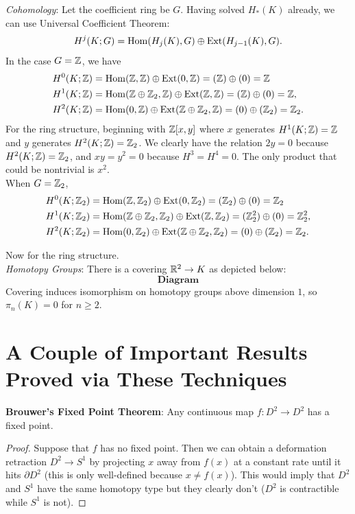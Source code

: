\documentclass{amsart}
\begin{document}
	\textit{Cohomology}: Let the coefficient ring be $G$. Having solved $H_*(K)$ already, we can use Universal Coefficient Theorem:
	$$
	H^j(K;G) = \operatorname{Hom}(H_j(K),G) \oplus \operatorname{Ext}(H_{j-1}(K),G).
	$$
	In the case $G=\mathbb{Z}$, we have 
	\begin{align*}	
	H^0(K;\mathbb{Z}) &= \operatorname{Hom}(\mathbb{Z},\mathbb{Z})\oplus \operatorname{Ext}(0,\mathbb{Z}) =(\mathbb{Z})\oplus (0)= \mathbb{Z}\\
	H^1(K;\mathbb{Z}) &= \operatorname{Hom}(\mathbb{Z}\oplus \mathbb{Z}_2,\mathbb{Z})\oplus \operatorname{Ext}(\mathbb{Z},\mathbb{Z}) = (\mathbb{Z})\oplus(0)= \mathbb{Z},\\ 
	H^2(K;\mathbb{Z}) &= \operatorname{Hom}(0,\mathbb{Z}) \oplus \operatorname{Ext}(\mathbb{Z}\oplus \mathbb{Z}_2,\mathbb{Z}) = (0)\oplus(\mathbb{Z}_2) = \mathbb{Z}_2.
	\end{align*}
	For the ring structure, beginning with $\mathbb{Z}[x,y]$ where $x$ generates $H^1(K;\mathbb{Z})=\mathbb{Z}$ and $y$ generates $H^2(K;\mathbb{Z})=\mathbb{Z}_2$. We clearly have the relation $2y=0$ because $H^2(K;\mathbb{Z})=\mathbb{Z}_2$, and $xy=y^2=0$ because $H^3=H^4=0$. The only product that could be nontrivial is $x^2$.\\
	
	When $G=\mathbb{Z}_2$,
	\begin{align*}	
	H^0(K;\mathbb{Z}_2) &= \operatorname{Hom}(\mathbb{Z},\mathbb{Z}_2)\oplus \operatorname{Ext}(0,\mathbb{Z}_2) =(\mathbb{Z}_2)\oplus (0)= \mathbb{Z}_2\\
	H^1(K;\mathbb{Z}_2) &= \operatorname{Hom}(\mathbb{Z}\oplus \mathbb{Z}_2,\mathbb{Z}_2)\oplus \operatorname{Ext}(\mathbb{Z},\mathbb{Z}_2) = (\mathbb{Z}_2^2)\oplus(0)= \mathbb{Z}_2^2,\\ 
	H^2(K;\mathbb{Z}_2) &= \operatorname{Hom}(0,\mathbb{Z}_2) \oplus \operatorname{Ext}(\mathbb{Z}\oplus \mathbb{Z}_2,\mathbb{Z}_2) = (0)\oplus(\mathbb{Z}_2) = \mathbb{Z}_2.
	\end{align*}
	
	Now for the ring structure. \\
	
	\textit{Homotopy Groups}: There is a covering $\mathbb{R}^2\to K$ as depicted below:
	$$
	\textbf{Diagram}
	$$
	Covering induces isomorphism on homotopy groups above dimension $1$, so $\pi_n(K)=0$ for $n\geq 2$.
	
	\newpage
	\section{A Couple of Important Results Proved via These Techniques}
	
	\textbf{Brouwer's Fixed Point Theorem}: Any continuous map $f:D^2\to D^2$ has a fixed point.
	\begin{proof}
		Suppose that $f$ has no fixed point. Then we can obtain a deformation retraction $D^2\to S^1$ by projecting $x$ away from $f(x)$ at a constant rate until it hits $\partial D^2$ (this is only well-defined because $x\neq f(x)$). This would imply that $D^2$ and $S^1$ have the same homotopy type but they clearly don't ($D^2$ is contractible while $S^1$ is not).
	\end{proof}\\
	
\end{document}
